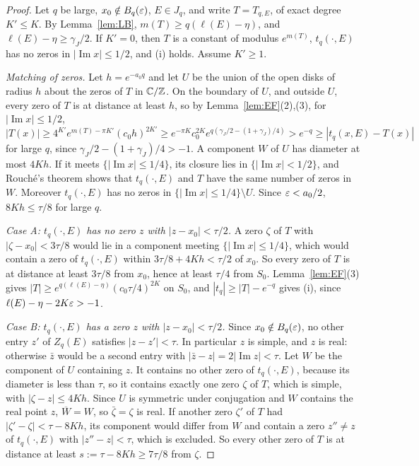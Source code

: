 \begin{proof}
Let $q$ be large, $x_0\notin B_q(\varepsilon)$, $E\in J_q$, and write $T=T_{q,E}$, of exact degree $K'\le K$. By Lemma~\ref{lem:LB}, $m(T)\ge q(\ell(E)-\eta)$, and $\ell(E)-\eta\ge\gamma_J/2$. If $K'=0$, then $T$ is a constant of modulus $e^{m(T)}$, $t_q(\cdot,E)$ has no zeros in $|\operatorname{Im}x|\le1/2$, and (i) holds. Assume $K'\ge1$.

\emph{Matching of zeros.} Let $h=e^{-a_0q}$ and let $U$ be the union of the open disks of radius $h$ about the zeros of $T$ in $\mathbb C/\mathbb Z$. On the boundary of $U$, and outside $U$, every zero of $T$ is at distance at least $h$, so by Lemma~\ref{lem:EF}(2),(3), for $|\operatorname{Im}x|\le1/2$,
\[
|T(x)|\ge4^{K'}e^{m(T)-\pi K'}(c_0h)^{2K'}\ge e^{-\pi K}c_0^{2K}e^{q(\gamma_J/2-(1+\gamma_J)/4)}>e^{-q}\ge|t_q(x,E)-T(x)|
\]
for large $q$, since $\gamma_J/2-(1+\gamma_J)/4>-1$. A component $W$ of $U$ has diameter at most $4Kh$. If it meets $\{|\operatorname{Im}x|\le1/4\}$, its closure lies in $\{|\operatorname{Im}x|<1/2\}$, and Rouch\'e's theorem shows that $t_q(\cdot,E)$ and $T$ have the same number of zeros in $W$. Moreover $t_q(\cdot,E)$ has no zeros in $\{|\operatorname{Im}x|\le1/4\}\setminus U$. Since $\varepsilon<a_0/2$, $8Kh\le\tau/8$ for large $q$.

\emph{Case A: $t_q(\cdot,E)$ has no zero $z$ with $|z-x_0|<\tau/2$.} A zero $\zeta$ of $T$ with $|\zeta-x_0|<3\tau/8$ would lie in a component meeting $\{|\operatorname{Im}x|\le1/4\}$, which would contain a zero of $t_q(\cdot,E)$ within $3\tau/8+4Kh<\tau/2$ of $x_0$. So every zero of $T$ is at distance at least $3\tau/8$ from $x_0$, hence at least $\tau/4$ from $S_0$. Lemma~\ref{lem:EF}(3) gives $|T|\ge e^{q(\ell(E)-\eta)}(c_0\tau/4)^{2K}$ on $S_0$, and $|t_q|\ge|T|-e^{-q}$ gives (i), since $\ell(E)-\eta-2K\varepsilon>-1$.

\emph{Case B: $t_q(\cdot,E)$ has a zero $z$ with $|z-x_0|<\tau/2$.} Since $x_0\notin B_q(\varepsilon)$, no other entry $z'$ of $Z_q(E)$ satisfies $|z-z'|<\tau$. In particular $z$ is simple, and $z$ is real: otherwise $\bar z$ would be a second entry with $|\bar z-z|=2|\operatorname{Im}z|<\tau$. Let $W$ be the component of $U$ containing $z$. It contains no other zero of $t_q(\cdot,E)$, because its diameter is less than $\tau$, so it contains exactly one zero $\zeta$ of $T$, which is simple, with $|\zeta-z|\le4Kh$. Since $U$ is symmetric under conjugation and $W$ contains the real point $z$, $\overline W=W$, so $\bar\zeta=\zeta$ is real. If another zero $\zeta'$ of $T$ had $|\zeta'-\zeta|<\tau-8Kh$, its component would differ from $W$ and contain a zero $z''\ne z$ of $t_q(\cdot,E)$ with $|z''-z|<\tau$, which is excluded. So every other zero of $T$ is at distance at least $s:=\tau-8Kh\ge7\tau/8$ from $\zeta$.


\end{proof}
